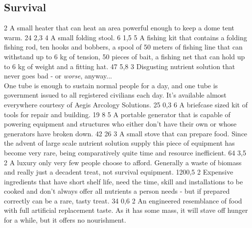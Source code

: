 \subsection{Survival}
\vspace{10mm}
\begin{multicols}{2}
    {A small heater that can heat an area powerful enough to keep a dome tent warm.}
    {24}
    {2,3}
    {4}
    {A small folding stool.}
    {6}
    {1,5}
    {5}
    {A fishing kit that contains
        a folding fishing rod,
        ten hooks and bobbers,
        a spool of 50 meters of fishing line
        that can withstand up to 6 kg of tension,
        50 pieces of bait,
        a fishing net that can hold up to 6 kg of weight
        and a fitting hat.}
    {47}
    {5,8}
    {3}
    {Disgusting nutrient solution that never goes bad
        - or \textit{worse}, anyway... \\
        One tube is enough to sustain normal people for a day,
        and one tube is government issued to all registered civilians each day.
        It's available almost everywhere courtesy of Aegis Arcology Solutions.
    }
    {25}
    {0,3}
    {6}
    {A briefcase sized kit of tools for repair and building.}
    {19}
    {8}
    {5}
    {A portable generator that is capable of
        powering equipment and structures
        who either don't have their own or whose generators have broken down.}
    {42}
    {26}
    {3}
    {A small stove that can prepare food.
        Since the advent of large scale nutrient solution supply
        this piece of equipment has become very rare,
        being comparatively quite time and resource inefficient.}
    {64}
    {3,5}
    {2}
    {A luxury only very few people choose to afford.
        Generally a waste of biomass
        and really just a decadent treat, not survival equipment.}
    {120}{0,5}
    {2}
    {Expensive ingredients that have short shelf life,
        need the time, skill and installations to be cooked
        and don't always offer all nutrients a person needs -
        but if prepared correctly can be a rare, tasty treat.}
    {34}
    {0,6}
    {2}
    {An engineered resemblance of food with full artificial replacement taste.
        As it has some mass, it will stave off hunger for a while,
        but it offers no nourishment.}

\end{multicols}

